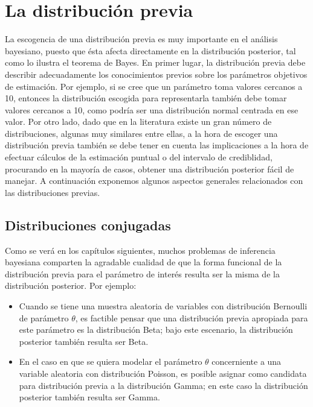 \documentclass[
  10pt,
  spanish,
]{book}
\theoremstyle{definition}
\theoremstyle{definition}
\theoremstyle{definition}
\theoremstyle{definition}
\theoremstyle{remark}
\begin{document}
\hypertarget{la-distribuciuxf3n-previa}{%
\section{La distribución previa}\label{la-distribuciuxf3n-previa}}

La escogencia de una distribución previa es muy importante en el
análisis bayesiano, puesto que ésta afecta directamente en la
distribución posterior, tal como lo ilustra el teorema de Bayes. En
primer lugar, la distribución previa debe describir adecuadamente los
conocimientos previos sobre los parámetros objetivos de estimación. Por
ejemplo, si se cree que un parámetro toma valores cercanos a 10,
entonces la distribución escogida para representarla también debe tomar
valores cercanos a 10, como podría ser una distribución normal centrada en
ese valor. Por otro lado, dado que en la literatura existe un gran
número de distribuciones, algunas muy similares entre ellas, a la hora
de escoger una distribución previa también se debe tener en cuenta las
implicaciones a la hora de efectuar cálculos de la estimación puntual o
del intervalo de crediblidad, procurando en la mayoría de casos, obtener
una distribución posterior fácil de manejar. A continuación exponemos
algunos aspectos generales relacionados con las distribuciones previas.

\hypertarget{distribuciones-conjugadas}{%
\subsection{Distribuciones conjugadas}\label{distribuciones-conjugadas}}

Como se verá en los capítulos siguientes, muchos problemas de inferencia
bayesiana comparten la agradable cualidad de que la forma funcional de
la distribución previa para el parámetro de interés resulta ser
la misma de la distribución posterior. Por ejemplo:

\begin{itemize}
\item
  Cuando se tiene una muestra aleatoria de variables con distribución
  Bernoulli de parámetro \(\theta\), es factible pensar que una distribución
  previa apropiada para este parámetro es la distribución Beta;
  bajo este escenario, la distribución posterior también resulta
  ser Beta.
\item
  En el caso en que se quiera modelar el parámetro \(\theta\) concerniente a
  una variable aleatoria con distribución Poisson, es posible asignar como
  candidata para distribución previa a la distribución Gamma; en
  este caso la distribución posterior también resulta ser Gamma.
\end{itemize}
\end{document}
